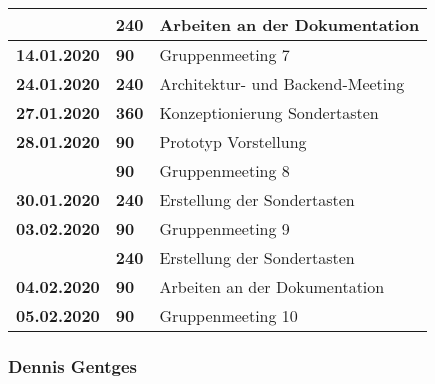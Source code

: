 {\begin{longtable}{|l|l|p{11cm}|}
		& \textbf{\hfill 240} & Arbeiten an der Dokumentation
		\\ \hline \textbf{14.01.2020}
		& \textbf{\hfill 90} & Gruppenmeeting 7
		\\ \hline \textbf{24.01.2020}
		& \textbf{\hfill 240} & Architektur- und Backend-Meeting
		\\ \hline \textbf{27.01.2020}
		& \textbf{\hfill 360} & Konzeptionierung Sondertasten
		\\ \hline \textbf{28.01.2020}
		& \textbf{\hfill 90} & Prototyp Vorstellung \\\cline{2-3}
		& \textbf{\hfill 90} & Gruppenmeeting 8
		\\ \hline \textbf{30.01.2020}
		& \textbf{\hfill 240} & Erstellung der Sondertasten 
		\\ \hline \textbf{03.02.2020}
		& \textbf{\hfill 90} & Gruppenmeeting 9  \\\cline{2-3}
		& \textbf{\hfill 240} & Erstellung der Sondertasten 
		\\ \hline \textbf{04.02.2020}
		& \textbf{\hfill 90} & Arbeiten an der Dokumentation
		\\ \hline \textbf{05.02.2020}
		& \textbf{\hfill 90} & Gruppenmeeting 10 
		\\ \hline
	\end{longtable}
}

\clearpage

\subsubsection{Dennis Gentges}

